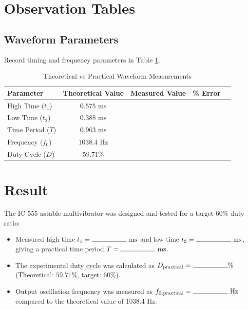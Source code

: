 \section{Observation Tables}

\subsection{Waveform Parameters}
Record timing and frequency parameters in Table \ref{tab:obs_astable_timing}.

\begin{table}[h!]
\centering
\caption{Theoretical vs Practical Waveform Measurements}
\label{tab:obs_astable_timing}
\begin{tabular}{lcccc}
\toprule
\textbf{Parameter} & \textbf{Theoretical Value} & \textbf{Measured Value} & \textbf{\% Error} \\
\midrule
High Time ($t_1$) & $0.575\text{ ms}$ & & \\
Low Time ($t_2$) & $0.388\text{ ms}$ & & \\
Time Period ($T$) & $0.963\text{ ms}$ & & \\
Frequency ($f_0$) & $1038.4\text{ Hz}$ & & \\
Duty Cycle ($D$) & $59.71\%$ & & \\
\bottomrule
\end{tabular}
\end{table}

\section{Result}
The IC 555 astable multivibrator was designed and tested for a target $60\%$ duty ratio:
\begin{itemize}
\item Measured high time $t_1 = \rule{1.8cm}{0.15mm}\text{ ms}$ and low time $t_2 = \rule{1.8cm}{0.15mm}\text{ ms}$, giving a practical time period $T = \rule{1.8cm}{0.15mm}\text{ ms}$.
\item The experimental duty cycle was calculated as $D_{\text{practical}} = \rule{1.8cm}{0.15mm}\%$ (Theoretical: $59.71\%$, target: $60\%$).
\item Output oscillation frequency was measured as $f_{0,\text{practical}} = \rule{1.8cm}{0.15mm}\text{ Hz}$ compared to the theoretical value of $1038.4\text{ Hz}$.
\end{itemize}

